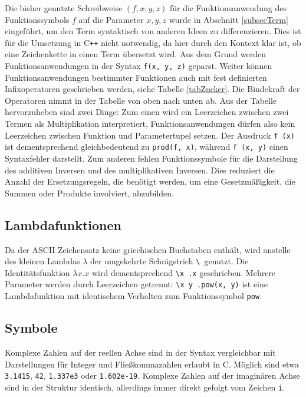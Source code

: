 Die bisher genutzte Schreibweise $(f, x, y, z)$ für die Funktionsanwendung des Funktionssymbols $f$ auf die Parameter $x, y, z$ wurde in Abschnitt \ref{subsecTerm} eingeführt, um den Term syntaktisch von anderen Ideen zu differenzieren. Dies ist für die Umsetzung in C\texttt{++} nicht notwendig, da hier durch den Kontext klar ist, ob eine Zeichenkette in einen Term übersetzt wird. Aus dem Grund werden Funktionsanwendungen in der Syntax \verb|f(x, y, z)| geparst. 
Weiter können Funktionsanwendungen bestimmter Funktionen auch mit fest definierten Infixoperatoren geschrieben werden, siehe Tabelle \ref{tabZucker}. Die Bindekraft der Operatoren nimmt in der Tabelle von oben nach unten ab.
Aus der Tabelle hervorzuheben sind zwei Dinge: Zum einen wird ein Leerzeichen zwischen zwei Termen als Multiplikation interpretiert, Funktionsanwendungen dürfen also kein Leerzeichen zwischen Funktion und Parametertupel setzen. Der Ausdruck \verb|f (x)| ist dementsprechend gleichbedeutend zu \verb|prod(f, x)|, während \verb|f (x, y)| einen Syntaxfehler darstellt. Zum anderen fehlen Funktionssymbole für die Darstellung des additiven Inversen und des multiplikativen Inversen. Dies reduziert die Anzahl der Ersetzungsregeln, die benötigt werden, um eine Gesetzmäßigkeit, die Summen oder Produkte involviert, abzubilden. 

\subsection{Lambdafunktionen} \label{subsubsecLambdaSyntax}
Da der ASCII Zeichensatz keine griechischen Buchstaben enthält, wird anstelle des kleinen Lambdas $\lambda$ der umgekehrte Schrägstrich \verb~\ ~genutzt. Die Identitätsfunktion $\lambda x.x$ wird dementsprechend \verb~\x .x~ geschrieben. Mehrere Parameter werden durch Leerzeichen getrennt: \verb~\x y .pow(x, y)~ ist eine Lambdafunktion mit identischem Verhalten zum Funktionssymbol \verb|pow|.

\subsection{Symbole}
Komplexe Zahlen auf der reellen Achse sind in der Syntax vergleichbar mit Darstellungen für Integer und Fließkommazahlen erlaubt in C. Möglich sind etwa \verb|3.1415|, \verb|42|, \verb|1.337e3| oder \verb|1.602e-19|. Komplexe Zahlen auf der imaginären Achse sind in der Struktur identisch, allerdings immer direkt gefolgt vom Zeichen \verb|i|. 

